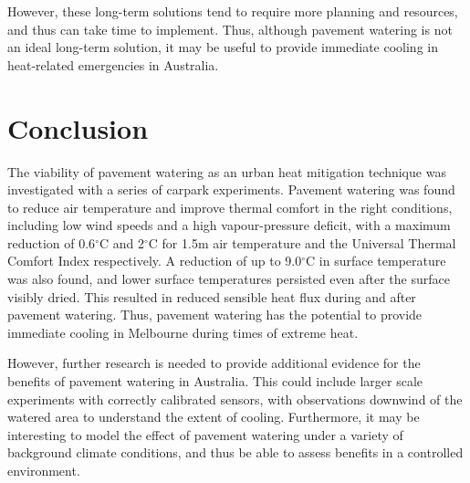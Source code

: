 \documentclass[final,3p,times,authoryear]{elsarticle}
\begin{document}
However, these long-term solutions tend to require more planning and resources, and thus can take time to implement. Thus, although pavement watering is not an ideal long-term solution, it may be useful to provide immediate cooling in heat-related emergencies in Australia.

\section{Conclusion}\label{sec:conclusion}

The viability of pavement watering as an urban heat mitigation technique was investigated with a series of carpark experiments. Pavement watering was found to reduce air temperature and improve thermal comfort in the right conditions, including low wind speeds and a high vapour-pressure deficit, with a maximum reduction of 0.6$^{\circ}$C and 2$^{\circ}$C for 1.5m air temperature and the Universal Thermal Comfort Index respectively. A reduction of up to 9.0$^{\circ}$C in surface temperature was also found, and lower surface temperatures persisted even after the surface visibly dried. This resulted in reduced sensible heat flux during and after pavement watering. Thus, pavement watering has the potential to provide immediate cooling in Melbourne during times of extreme heat.

However, further research is needed to provide additional evidence for the benefits of pavement watering in Australia. This could include larger scale experiments with correctly calibrated sensors, with observations downwind of the watered area to understand the extent of cooling. Furthermore, it may be interesting to model the effect of pavement watering under a variety of background climate conditions, and thus be able to assess benefits in a controlled environment.



\printglossaries

 

\end{document}

